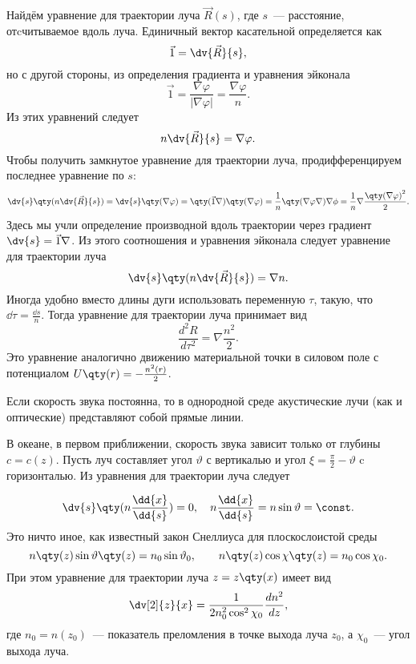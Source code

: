 Найдём уравнение для траектории луча $\vec{R}(s)$, где $s$~--- расстояние, отcчитываемое вдоль луча. Единичный вектор касательной определяется как
\begin{equation}
\vec{1}= \dv{\vec{R}}{s},
\end{equation}
но с другой стороны, из определения градиента и уравнения эйконала
\begin{equation}
\vec{1} = \frac{\nabla \varphi}{\left|\nabla \varphi\right|} = \frac{\nabla \varphi}{n}.
\end{equation}
Из этих уравнений следует
\begin{equation}
n \dv{\vec{R}}{s} = \nabla \varphi.
\end{equation}
Чтобы получить замкнутое уравнение для траектории луча, продифференцируем последнее уравнение по $s$:
\begin{equation}
\dv{s} \qty(n \dv{\vec{R}}{s}) = \dv{s} \qty(\nabla \varphi) = \qty(\vec{1} \nabla) \qty(\nabla \varphi) = \frac{1}{n} \qty(\nabla \varphi \nabla) \nabla \phi= \frac{1}{n} \nabla \frac{{\qty(\nabla \varphi)}^2}{2}.
\end{equation}
Здесь мы учли определение производной вдоль траектории через градиент $\dv{s} =\vec{1} \nabla$. Из этого соотношения и уравнения эйконала следует уравнение для траектории луча
\begin{equation}
\dv{s} \qty(n \dv{\vec{R}}{s}) = \nabla n.
\end{equation}
Иногда удобно вместо длины дуги использовать переменную $\tau$, такую, что $\dd{\tau}= \frac{\dd{s}}{n}$. Тогда уравнение для траектории луча принимает вид
\begin{equation}
\frac{d^2 R}{d \tau^2} = \nabla \frac{n^2}{2}.
\end{equation}
Это уравнение аналогично движению материальной точки в силовом поле с потенциалом $U \qty(r) =- \frac{n^2 (r)}{2}$.

Если скорость звука постоянна, то в однородной среде акустические лучи (как и оптические) представляют собой прямые линии.

В океане, в первом приближении, скорость звука зависит только от глубины $c=c(z)$. Пусть луч составляет угол $\vartheta$ с вертикалью и угол $\xi= \frac{\pi}{2}-\vartheta$ c горизонталью. Из уравнения для траектории луча следует

\begin{equation}
\dv{s} \qty(n \frac{\dd{x}}{\dd{s}}) =0, \quad n \frac{\dd{x}}{\dd{s}} =n \sin \vartheta =\const.
\end{equation}
Это ничто иное, как известный закон Снеллиуса для плоскослоистой среды
\begin{equation}
n \qty(z) \sin \vartheta \qty(z) = n_{0} \sin \vartheta_0 , \quad \quad n \qty(z) \cos\chi \qty(z) = n_{0} \cos\chi_0.
\end{equation}
При этом уравнение для траектории луча $z=z \qty(x)$ имеет вид
\begin{equation}
\dv[2]{z}{x} = \frac{1}{2 n_0^2 \cos^2 \chi_0} \frac{d n^2}{dz},
\end{equation}
где $n_0 =n( z_0 )$~--- показатель преломления в точке выхода луча $z_0$, а $\chi_0$~--- угол выхода луча.

